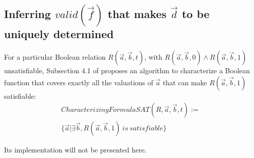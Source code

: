 \documentclass[conference]{IEEEtran}
\begin{document}





\subsection{Inferring $valid(\vec{f})$ that makes $\vec{d}$ to be uniquely determined}\label{subsec_infer}

For a particular Boolean relation $R(\vec{a},\vec{b},t)$, 
with $R(\vec{a},\vec{b},0)\wedge R(\vec{a},\vec{b},1)$ unsatisfiable,
Subsection 4.1 of \cite{QinTODAES15} proposes an algorithm 
to characterize a Boolean function 
that covers exactly all the valuations of $\vec{a}$ 
that can make $R(\vec{a},\vec{b},1)$ satisfiable:
\begin{multline}\label{eq_charsat}
 CharacterizingFormulaSAT(R,\vec{a},\vec{b},t):=\\\{\vec{a}|\exists \vec{b},R(\vec{a},\vec{b},1)~is~satisfiable\}
\end{multline}

Its implementation will not be presented here.
\end{document}
